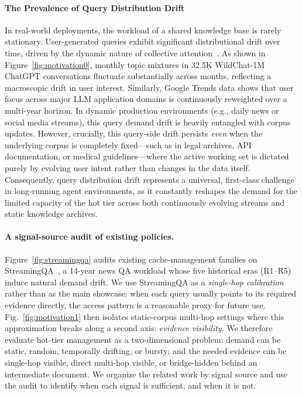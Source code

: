 \paragraph{The Prevalence of Query Distribution Drift} In real-world deployments, the workload of a shared knowledge base is rarely stationary. User-generated queries exhibit significant distributional drift over time, driven by the dynamic nature of collective attention~\cite{yang2025murr}. As shown in Figure~\ref{fig:motivation0}, monthly topic mixtures in 32.5K WildChat-1M~\cite{zhao2024wildchat} ChatGPT conversations fluctuate substantially across months, reflecting a macroscopic drift in user interest. Similarly, Google Trends data shows that user focus across major LLM application domains is continuously reweighted over a multi-year horizon. In dynamic production environments (e.g., daily news or social media streams), this query demand drift is heavily entangled with corpus updates. However, crucially, this query-side drift persists \emph{even} when the underlying corpus is completely fixed—such as in legal archives, API documentation, or medical guidelines—where the active working set is dictated purely by evolving user intent rather than changes in the data itself. Consequently, query distribution drift represents a universal, first-class challenge in long-running agent environments, as it constantly reshapes the demand for the limited capacity of the hot tier across both continuously evolving streams and static knowledge archives.


\paragraph{A signal-source audit of existing policies.} Figure~\ref{fig:streamingqa} audits existing cache-management families on StreamingQA~\cite{liska2022streamingqa}, a 14-year news QA workload whose five historical eras (R1--R5) induce natural demand drift. We use StreamingQA as a \emph{single-hop calibration} rather than as the main showcase: when each query usually points to its required evidence directly, the access pattern is a reasonable proxy for future use. Fig.~\ref{fig:motivation1} then isolates static-corpus multi-hop settings where this approximation breaks along a second axis: \emph{evidence visibility}. We therefore evaluate hot-tier management as a two-dimensional problem: demand can be static, random, temporally drifting, or bursty; and the needed evidence can be single-hop visible, direct multi-hop visible, or bridge-hidden behind an intermediate document. We organize the related work by signal source and use the audit to identify when each signal is sufficient, and when it is not.

